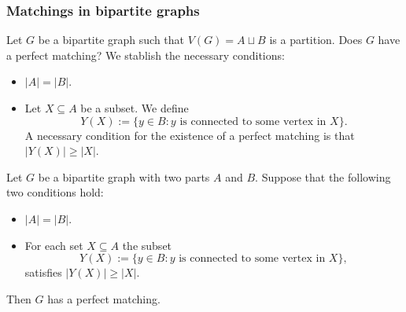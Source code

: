 \subsubsection*{Matchings in bipartite graphs}
Let $G$ be a bipartite graph such that $V(G)=A\sqcup B$ is a partition. Does $G$ have a perfect matching? We stablish the necessary conditions:
\begin{itemize}
\item $|A|=|B|$.
\item Let $X\subseteq A$ be a subset. We define
$$
Y(X):= \{ y\in B:y\text{ is connected to some vertex in }X \}.
$$
A necessary condition for the existence of a perfect matching is that $|Y(X)|\ge|X|$.
\end{itemize}
\begin{theorem}
Let $G$ be a bipartite graph with two parts $A$ and $B$. Suppose that the following two conditions hold:
\begin{itemize}
\item $|A|=|B|$.
\item For each set $X\subseteq A$ the subset
$$
Y(X):= \{ y\in B:y\text{ is connected to some vertex in }X \},
$$
satisfies $|Y(X)|\ge|X|$.
\end{itemize}
Then $G$ has a perfect matching.
\end{theorem}
